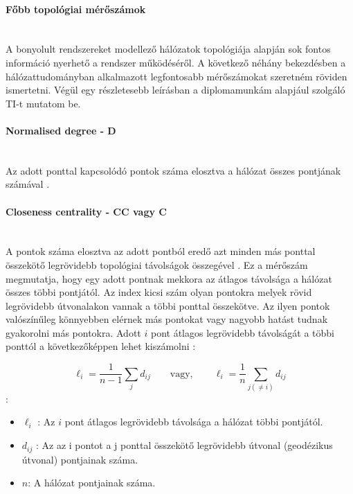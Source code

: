 \documentclass[a4paper,12pt]{article}
\begin{document}
	 \paragraph{Főbb topológiai mérőszámok} \mbox{}\\
	 A bonyolult rendszereket modellező hálózatok topológiája alapján sok fontos információ nyerhető a rendszer működéséről. A következő néhány bekezdésben a hálózattudományban alkalmazott legfontosabb mérőszámokat szeretném röviden ismertetni. Végül egy részletesebb leírásban a diplomamunkám alapjául szolgáló TI-t mutatom be.
	 
	 \paragraph{Normalised degree - D} \mbox{}\\Az adott ponttal kapcsolódó pontok száma elosztva a hálózat összes pontjának számával \cite{top_indexes}.
	 
	 \paragraph{Closeness centrality - CC vagy C } \mbox{}\\ A pontok száma elosztva az adott pontból eredő azt minden más ponttal összekötő legrövidebb topológiai távolságok összegével \cite{top_indexes}. Ez a mérőszám megmutatja, hogy egy adott pontnak mekkora az átlagos távolsága a hálózat összes többi pontjától. Az index kicsi szám olyan pontokra melyek rövid legrövidebb útvonalakon vannak a többi ponttal összekötve. Az ilyen pontok valószínűleg könnyebben elérnek más pontokat vagy nagyobb hatást tudnak gyakorolni más pontokra. Adott $i$ pont átlagos legrövidebb távolságát a többi ponttól a következőképpen lehet kiszámolni \cite{newman_networks}:
	 
	 	\begin{equation}
			\ell_i= \frac{1}{n-1} \sum_{j} d_{ij} \qquad \mathrm{vagy,} \qquad \ell_i= \frac{1}{n} \sum_{j (\neq i)} d_{ij}
	 	\end{equation}
	 	 :
	 	 \begin{itemize}[label=]
	 	 	\item $\ell_i$ : Az $i$ pont átlagos legrövidebb távolsága a hálózat többi pontjától.
			\item $d_{ij}$ : Az az i pontot a j ponttal összekötő legrövidebb útvonal (geodézikus útvonal) pontjainak száma.
			\item $n$: A hálózat pontjainak száma.
	 	 \end{itemize}
	 
\end{document}
